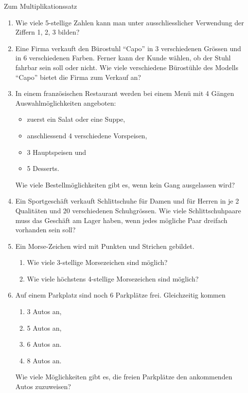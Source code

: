 


\clearpage
\begin{ueb}
    {Zum Multiplikationssatz}{}
    \begin{enumerate}
        \item Wie viele 5-stellige Zahlen kann man unter ausschliesslicher Verwendung der Ziffern 1, 2, 3 bilden?

        \item Eine Firma verkauft den Bürostuhl ``Capo'' in 3 verschiedenen Grössen und in 6 verschiedenen Farben. Ferner kann der Kunde wählen, ob der Stuhl fahrbar sein soll oder nicht. Wie viele verschiedene Bürostühle des Modells ``Capo'' bietet die Firma zum Verkauf an?

        \item In einem französischen Restaurant werden bei einem Menü mit 4 Gängen Auswahlmöglichkeiten angeboten:
              \begin{itemize}
                  \item zuerst ein Salat oder eine Suppe,
                  \item anschliessend 4 verschiedene Vorspeisen,
                  \item 3 Hauptspeisen und
                  \item 5 Desserts.
              \end{itemize}
              Wie viele Bestellmöglichkeiten gibt es, wenn kein Gang ausgelassen wird?

        \item Ein Sportgeschäft verkauft Schlittschuhe für Damen und für Herren in je 2 Qualitäten und 20 verschiedenen Schuhgrössen. Wie viele Schlittschuhpaare muss das Geschäft am Lager haben, wenn jedes mögliche Paar dreifach vorhanden sein soll?

        \item Ein Morse-Zeichen wird mit Punkten und Strichen gebildet.
              \begin{enumerate}
                  \item Wie viele 3-stellige Morsezeichen sind möglich?
                  \item Wie viele höchstens 4-stellige Morsezeichen sind möglich?
              \end{enumerate}

        \item Auf einem Parkplatz sind noch 6 Parkplätze frei. Gleichzeitig kommen
              \begin{enumerate}
                  \item 3 Autos an,
                  \item 5 Autos an,
                  \item 6 Autos an.
                  \item 8 Autos an.
              \end{enumerate}
              Wie viele Möglichkeiten gibt es, die freien Parkplätze den ankommenden Autos zuzuweisen?


\end{enumerate}
\end{ueb}
